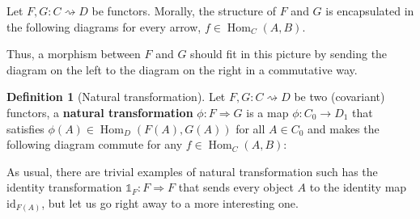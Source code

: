 \documentclass{article}
\theoremstyle{definition}
\newtheorem{defn}[thm]{Definition}
\theoremstyle{remark}
\newcommand{\one}{\mathbb{1}}
\DeclareMathOperator{\Hom}{Hom}
\newcommand{\id}{\text{id}}
\begin{document}
Let $F,G: C\rightsquigarrow D$ be functors. Morally, the structure of $F$ and $G$ is encapsulated in the following diagrams for every arrow, $f \in \Hom_C(A,B)$.
\begin{figure}[h]
	\centering
	\quad\quad
\end{figure}
Thus, a morphism between $F$ and $G$ should fit in this picture by sending the diagram on the left to the diagram on the right in a commutative way.
\begin{defn}[Natural transformation]\label{defnattran}
	Let $F,G : C \rightsquigarrow D$ be two (covariant) functors, a \textbf{natural transformation} $\phi: F \Rightarrow G$ is a map $\phi: C_0 \rightarrow D_1$ that satisfies $\phi(A) \in \Hom_D(F(A), G(A))$ for all $A \in C_0$ and makes the following diagram commute for any $f \in \Hom_C(A,B)$:
	\begin{figure}[H]
		\centering
	\end{figure}
\end{defn}
As usual, there are trivial examples of natural transformation such has the identity transformation $\one_F:F \Rightarrow F$ that sends every object $A$ to the identity map $\id_{F(A)}$, but let us go right away to a more interesting one.
\end{document}
